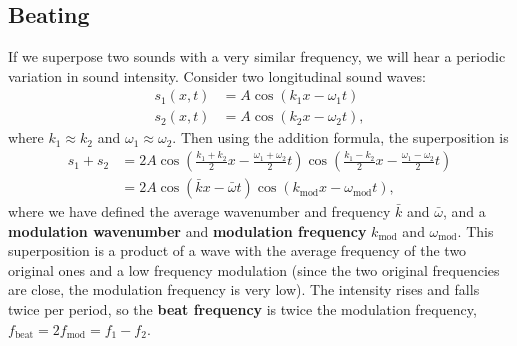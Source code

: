 \documentclass[../classical_mechanics.tex]{subfiles}
\begin{document}
        \subsection{Beating}\label{subsec:beating}
            If we superpose two sounds with a very similar frequency, we will hear a periodic variation in sound intensity.
            Consider two longitudinal sound waves:
            \begin{align}
                s_1(x,t)&=A\cos(k_1x-\omega_1t)\\
                s_2(x,t)&=A\cos(k_2x-\omega_2t),
            \end{align}
            where $k_1\approx k_2$ and $\omega_1\approx\omega_2$.
            Then using the addition formula, the superposition is
            \begin{align}
                s_1+s_2&=2A\cos\left(\frac{k_1+k_2}{2}x-\frac{\omega_1+\omega_2}{2}t\right)\cos\left(\frac{k_1-k_2}{2}x-\frac{\omega_1-\omega_2}{2}t\right)\\
                &=2A\cos(\bar{k}x-\bar{\omega}t)\cos(k_\text{mod}x-\omega_\text{mod}t),
            \end{align}
            where we have defined the average wavenumber and frequency $\bar{k}$ and $\bar{\omega}$, and a \textbf{modulation wavenumber} and \textbf{modulation frequency} $k_\text{mod}$ and $\omega_\text{mod}$.
            This superposition is a product of a wave with the average frequency of the two original ones and a low frequency modulation (since the two original frequencies are close, the modulation frequency is very low).
            The intensity rises and falls twice per period, so the \textbf{beat frequency} is twice the modulation frequency, $f_\text{beat}=2f_\text{mod}=f_1-f_2$.
\end{document}
